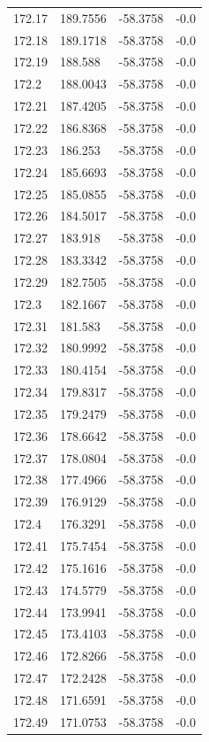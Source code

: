 \begin{table}[H]
\begin{tabular}{llll}
172.17 & 189.7556 & -58.3758 & -0.0 \\
172.18 & 189.1718 & -58.3758 & -0.0 \\
172.19 & 188.588 & -58.3758 & -0.0 \\
172.2 & 188.0043 & -58.3758 & -0.0 \\
172.21 & 187.4205 & -58.3758 & -0.0 \\
172.22 & 186.8368 & -58.3758 & -0.0 \\
172.23 & 186.253 & -58.3758 & -0.0 \\
172.24 & 185.6693 & -58.3758 & -0.0 \\
172.25 & 185.0855 & -58.3758 & -0.0 \\
172.26 & 184.5017 & -58.3758 & -0.0 \\
172.27 & 183.918 & -58.3758 & -0.0 \\
172.28 & 183.3342 & -58.3758 & -0.0 \\
172.29 & 182.7505 & -58.3758 & -0.0 \\
172.3 & 182.1667 & -58.3758 & -0.0 \\
172.31 & 181.583 & -58.3758 & -0.0 \\
172.32 & 180.9992 & -58.3758 & -0.0 \\
172.33 & 180.4154 & -58.3758 & -0.0 \\
172.34 & 179.8317 & -58.3758 & -0.0 \\
172.35 & 179.2479 & -58.3758 & -0.0 \\
172.36 & 178.6642 & -58.3758 & -0.0 \\
172.37 & 178.0804 & -58.3758 & -0.0 \\
172.38 & 177.4966 & -58.3758 & -0.0 \\
172.39 & 176.9129 & -58.3758 & -0.0 \\
172.4 & 176.3291 & -58.3758 & -0.0 \\
172.41 & 175.7454 & -58.3758 & -0.0 \\
172.42 & 175.1616 & -58.3758 & -0.0 \\
172.43 & 174.5779 & -58.3758 & -0.0 \\
172.44 & 173.9941 & -58.3758 & -0.0 \\
172.45 & 173.4103 & -58.3758 & -0.0 \\
172.46 & 172.8266 & -58.3758 & -0.0 \\
172.47 & 172.2428 & -58.3758 & -0.0 \\
172.48 & 171.6591 & -58.3758 & -0.0 \\
172.49 & 171.0753 & -58.3758 & -0.0 \\

\end{tabular}
\end{table}
